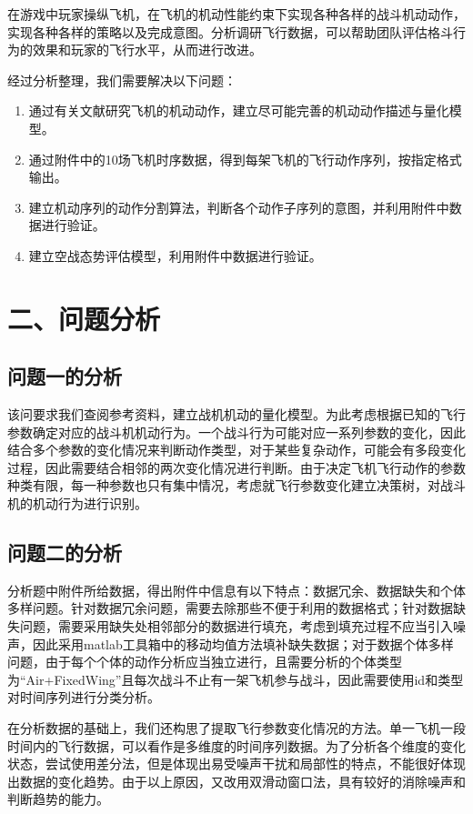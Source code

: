 \documentclass{my_paper}
\begin{document}
在游戏中玩家操纵飞机，在飞机的机动性能约束下实现各种各样的战斗机动动作，实现各种各样的策略以及完成意图。分析调研飞行数据，可以帮助团队评估格斗行为的效果和玩家的飞行水平，从而进行改进。

经过分析整理，我们需要解决以下问题：
\begin{enumerate}
    \item 通过有关文献研究飞机的机动动作，建立尽可能完善的机动动作描述与量化模型。
    \item 通过附件中的10场飞机时序数据，得到每架飞机的飞行动作序列，按指定格式输出。
    \item 建立机动序列的动作分割算法，判断各个动作子序列的意图，并利用附件中数据进行验证。
    \item 建立空战态势评估模型，利用附件中数据进行验证。
\end{enumerate}
\section{二、问题分析}
\subsection{问题一的分析}

该问要求我们查阅参考资料，建立战机机动的量化模型。为此考虑根据已知的飞行参数确定对应的战斗机机动行为。一个战斗行为可能对应一系列参数的变化，因此结合多个参数的变化情况来判断动作类型，对于某些复杂动作，可能会有多段变化过程，因此需要结合相邻的两次变化情况进行判断。由于决定飞机飞行动作的参数种类有限，每一种参数也只有集中情况，考虑就飞行参数变化建立决策树，对战斗机的机动行为进行识别。

\subsection{问题二的分析}

分析题中附件所给数据，得出附件中信息有以下特点：数据冗余、数据缺失和个体多样问题。针对数据冗余问题，需要去除那些不便于利用的数据格式；针对数据缺失问题，需要采用缺失处相邻部分的数据进行填充，考虑到填充过程不应当引入噪声，因此采用matlab工具箱中的移动均值方法填补缺失数据；对于数据个体多样问题，由于每个个体的动作分析应当独立进行，且需要分析的个体类型为“Air+FixedWing”且每次战斗不止有一架飞机参与战斗，因此需要使用id和类型对时间序列进行分类分析。

在分析数据的基础上，我们还构思了提取飞行参数变化情况的方法。单一飞机一段时间内的飞行数据，可以看作是多维度的时间序列数据。为了分析各个维度的变化状态，尝试使用差分法，但是体现出易受噪声干扰和局部性的特点，不能很好体现出数据的变化趋势。由于以上原因，又改用双滑动窗口法，具有较好的消除噪声和判断趋势的能力。
\end{document}
